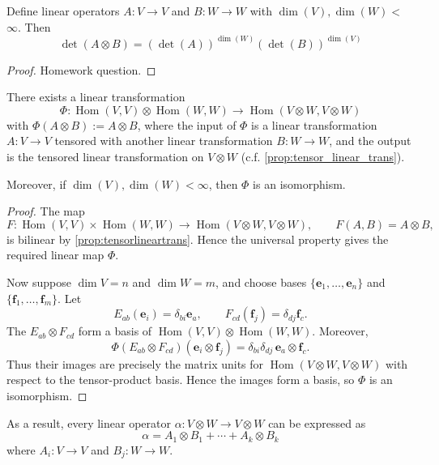 \begin{proposition}
Define linear operators \(A : V \rightarrow  V\) and \(B : W \rightarrow  W\) with \(\dim \left( V\right) ,\dim \left( W\right)  <\)  \(\infty\). Then
\[
\det \left( {A \otimes  B}\right)  = {\left( \det \left( A\right) \right) }^{\dim \left( W\right) }{\left( \det \left( B\right) \right) }^{\dim \left( V\right) }
\]
\end{proposition} 
\begin{proof}
    Homework question.
\end{proof}

\begin{corollary}
There exists a linear transformation
\[
\Phi : \operatorname{Hom}\left( {V,V}\right)  \otimes  \operatorname{Hom}\left( {W,W}\right)  \rightarrow  \operatorname{Hom}\left( {V \otimes  W,V \otimes  W}\right)
\]
with \(\Phi(A \otimes  B) :=  A \otimes  B\), where the input of \(\Phi\) is a linear transformation $A:V \to V$ tensored with another linear transformation $B: W \to W$, and the output is the tensored linear transformation on $V \otimes W$ (c.f. \autoref{prop:tensor_linear_trans}).

Moreover, if $\dim(V), \dim(W) < \infty$, then $\Phi$ is an isomorphism.
\end{corollary} 

\begin{proof}
The map
\[
F:\operatorname{Hom}(V,V)\times\operatorname{Hom}(W,W)
\longrightarrow \operatorname{Hom}(V\otimes W,V\otimes W),
\qquad F(A,B)=A\otimes B,
\]
is bilinear by \autoref{prop:tensorlineartrans}. Hence the universal property gives the required linear map $\Phi$.

Now suppose $\dim V=n$ and $\dim W=m$, and choose bases $\{\mathbf e_1,\ldots,\mathbf e_n\}$ and $\{\mathbf f_1,\ldots,\mathbf f_m\}$. Let
\[
E_{ab}(\mathbf e_i)=\delta_{bi}\mathbf e_a,
\qquad
F_{cd}(\mathbf f_j)=\delta_{dj}\mathbf f_c.
\]
The $E_{ab}\otimes F_{cd}$ form a basis of $\operatorname{Hom}(V,V)\otimes\operatorname{Hom}(W,W)$. Moreover,
\[
\Phi(E_{ab}\otimes F_{cd})(\mathbf e_i\otimes\mathbf f_j)
=\delta_{bi}\delta_{dj}\,\mathbf e_a\otimes\mathbf f_c.
\]
Thus their images are precisely the matrix units for $\operatorname{Hom}(V\otimes W,V\otimes W)$ with respect to the tensor-product basis. Hence the images form a basis, so $\Phi$ is an isomorphism.
\end{proof}

As a result, every linear operator \(\alpha  : V \otimes  W \rightarrow V \otimes  W\) can be expressed as
\[
\alpha  = {A}_1 \otimes  {B}_1 + \cdots  + {A}_{k} \otimes  {B}_{k}
\]
where \({A}_{i} : V \rightarrow  V\) and \({B}_{j} : W \rightarrow  W\).